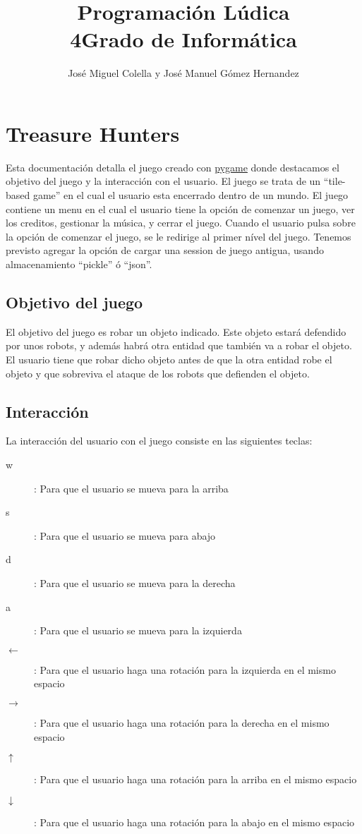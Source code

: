 \documentclass{article}
\title{Programación Lúdica\\4\degree Grado de Informática}
\author{José Miguel Colella y José Manuel Gómez Hernandez}
\begin{document}
\maketitle

\section{Treasure Hunters}
\label{sec:title}

Esta documentación detalla el juego creado con \href{pygame.org}{pygame} donde
destacamos el objetivo del juego y la interacción con el usuario. El juego se trata de un ``tile-based game'' en el cual el usuario esta encerrado dentro de un mundo. El juego contiene un menu en el cual el usuario tiene la opción de comenzar un juego, ver los creditos, gestionar la música, y cerrar el juego.
Cuando el usuario pulsa sobre la opción de comenzar el juego, se le redirige al primer nível del juego. Tenemos previsto agregar la opción de cargar una session de juego antigua, usando almacenamiento ``pickle'' ó ``json''.

\subsection{Objetivo del juego}

El objetivo del juego es robar un objeto indicado. Este objeto estará defendido por unos robots, y además habrá otra entidad que también va a robar el objeto. El usuario tiene que robar dicho objeto antes de que la otra entidad robe el objeto y que sobreviva el ataque de los robots que defienden el objeto.


\subsection{Interacción}

La interacción del usuario con el juego consiste en las siguientes teclas:
\begin{description}
    \item[w]: Para que el usuario se mueva para la arriba
    \item[s]: Para que el usuario se mueva para abajo
    \item[d]: Para que el usuario se mueva para la derecha
    \item[a]: Para que el usuario se mueva para la izquierda
    \item[$\leftarrow$]: Para que el usuario haga una rotación para la izquierda en el mismo espacio
    \item[$\rightarrow$]: Para que el usuario haga una rotación para la derecha en el mismo espacio
    \item[$\uparrow$]: Para que el usuario haga una rotación para la arriba en el mismo espacio
    \item[$\downarrow$]: Para que el usuario haga una rotación para la abajo en el mismo espacio
\end{description}
\end{document}
